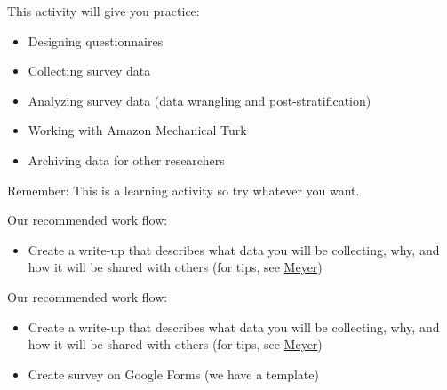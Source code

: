 \documentclass[aspectratio=169]{beamer}
\begin{document}
\begin{frame}

This activity will give you practice:
\begin{itemize}
\item Designing questionnaires
\pause
\item Collecting survey data
\pause
\item Analyzing survey data (data wrangling and post-stratification)
\pause
\item Working with Amazon Mechanical Turk
\pause
\item Archiving data for other researchers
\end{itemize}

\vfill
Remember: This is a learning activity so try whatever you want.

\end{frame}
\begin{frame}

Our recommended work flow:
\begin{itemize}
\item Create a write-up that describes what data you will be collecting, why, and how it will be shared with others (for tips, see \href{https://doi.org/10.1177/2515245917747656}{Meyer})
\end{itemize}

\end{frame}
\begin{frame}

Our recommended work flow:
\begin{itemize}
\item Create a write-up that describes what data you will be collecting, why, and how it will be shared with others (for tips, see \href{https://doi.org/10.1177/2515245917747656}{Meyer})
\item Create survey on Google Forms (we have a template)
\end{itemize}

\end{frame}
\end{document}

